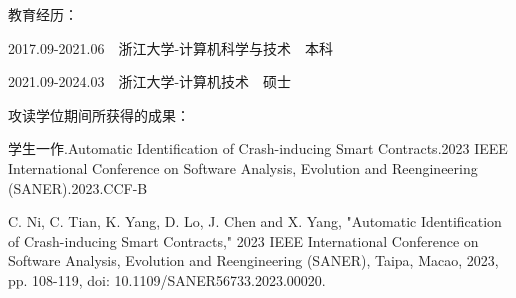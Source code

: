 \cleardoublepage
{}


\noindent 教育经历： 

2017.09-2021.06\ \ 浙江大学-计算机科学与技术\ \ 本科 

2021.09-2024.03\ \ 浙江大学-计算机技术\ \ 硕士 
 
\hspace*{\fill}
\hspace*{\fill}
 
\noindent 攻读学位期间所获得的成果：

{%
学生一作.Automatic Identification of Crash-inducing Smart Contracts.2023 IEEE International Conference on Software Analysis, Evolution and Reengineering (SANER).2023.CCF-B
}
{%
\begin{sloppypar}
C. Ni, C. Tian, K. Yang, D. Lo, J. Chen and X. Yang, "Automatic Identification of Crash-inducing Smart Contracts," 2023 IEEE International Conference on Software Analysis, Evolution and Reengineering (SANER), Taipa, Macao, 2023, pp. 108-119, doi: 10.1109/SANER56733.2023.00020.
\end{sloppypar}
}


